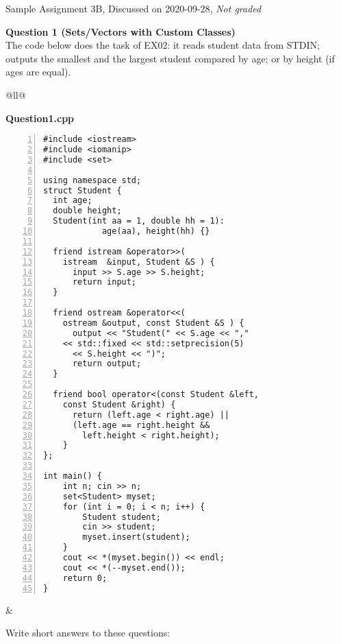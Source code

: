 \documentclass[11pt]{article}
\begin{document}
\thispagestyle{empty}



\begin{center}
{\Large Sample Assignment 3B, Discussed on 2020-09-28},
{\em Not graded}
\end{center}

\vspace{10pt}
{\bf Question 1 (Sets/Vectors with Custom Classes)}\\
The code below does the task of EX02: it reads student data from STDIN;
outputs the smallest and the largest student compared by age; 
or by height (if ages are equal). 


\vspace{10pt}
\begin{tabular}[t]{@{}ll@{}} 
\begin{minipage}[t]{0.48\columnwidth}
{\bf Question1.cpp}
{\footnotesize
\begin{Verbatim}[frame=single,numbers=left]
#include <iostream>
#include <iomanip> 
#include <set>

using namespace std;
struct Student {
  int age;
  double height;
  Student(int aa = 1, double hh = 1): 
	        age(aa), height(hh) {}

  friend istream &operator>>(
    istream  &input, Student &S ) { 
      input >> S.age >> S.height;
      return input;            
  }

  friend ostream &operator<<( 
    ostream &output, const Student &S ) { 
      output << "Student(" << S.age << "," 
	<< std::fixed << std::setprecision(5) 
	  << S.height << ")";
      return output;            
  }

  friend bool operator<(const Student &left, 
    const Student &right) {
      return (left.age < right.age) || 
      (left.age == right.height && 
        left.height < right.height);
    }
};

int main() {
    int n; cin >> n;
    set<Student> myset;
    for (int i = 0; i < n; i++) {
        Student student; 
        cin >> student;
        myset.insert(student);
    }
    cout << *(myset.begin()) << endl;
    cout << *(--myset.end());
    return 0;
}
\end{Verbatim}
}
\end{minipage} &
\begin{minipage}[t]{0.5\columnwidth}

Write short answers to these questions:


\end{minipage}
\end{tabular}
\end{document}
